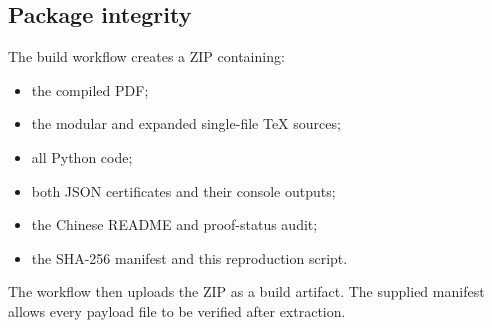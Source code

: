 \subsection{Package integrity}

The build workflow creates a ZIP containing:
\begin{itemize}[leftmargin=2em]
\item the compiled PDF;
\item the modular and expanded single-file TeX sources;
\item all Python code;
\item both JSON certificates and their console outputs;
\item the Chinese README and proof-status audit;
\item the SHA-256 manifest and this reproduction script.
\end{itemize}
The workflow then uploads the ZIP as a build artifact.  The supplied manifest
allows every payload file to be verified after extraction.
